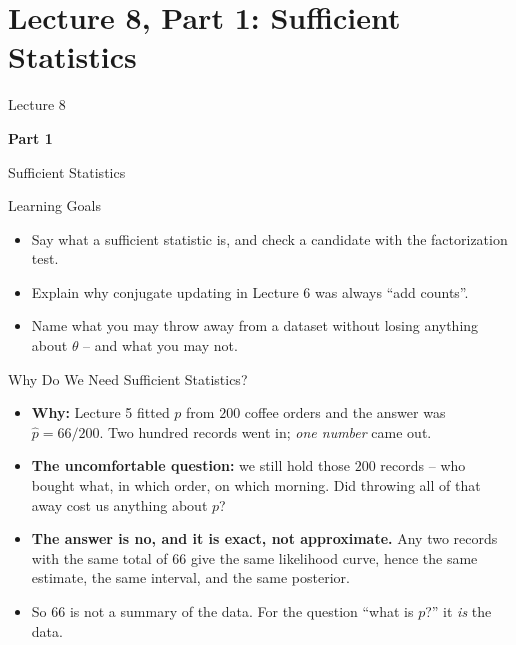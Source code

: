 \section{Lecture 8, Part 1: Sufficient Statistics}

\begin{frame}
\vfill
\centering
{\color{RLBlue}\large Lecture 8}

\vspace{0.3em}
{\color{RLBlue}\Large\bfseries Part 1}

\vspace{0.6em}
{\Large Sufficient Statistics}
\vfill
\end{frame}

\begin{frame}{Learning Goals}
\begin{itemize}
  \item Say what a sufficient statistic is, and check a candidate with the factorization test.
  \pause
  \item Explain why conjugate updating in Lecture 6 was always ``add counts''.
  \pause
  \item Name what you may throw away from a dataset without losing anything about $\theta$ -- and what you may not.
\end{itemize}
\end{frame}

\begin{frame}{Why Do We Need Sufficient Statistics?}
\begin{itemize}
  \item \textbf{Why:} Lecture 5 fitted $p$ from $200$ coffee orders and the answer was $\hat{p} = 66/200$. Two hundred records went in; \emph{one number} came out.
  \pause
  \item \textbf{The uncomfortable question:} we still hold those $200$ records -- who bought what, in which order, on which morning. Did throwing all of that away cost us anything about $p$?
  \pause
  \item \textbf{The answer is no, and it is exact, not approximate.} Any two records with the same total of $66$ give the same likelihood curve, hence the same estimate, the same interval, and the same posterior.
  \pause
  \item So $66$ is not a summary of the data. For the question ``what is $p$?'' it \emph{is} the data.
\end{itemize}
\end{frame}

